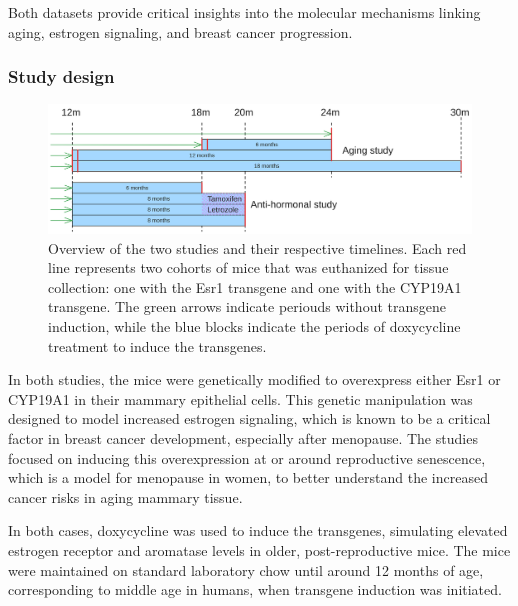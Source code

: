 Both datasets provide critical insights into the molecular mechanisms linking
aging, estrogen signaling, and breast cancer progression.

\subsubsection{Study design}

\begin{figure}[ht]
    \centering

    \includegraphics[width=\textwidth]{chapters/3_materials_and_methods/figures/datasets.png}
    \caption{Overview of the two studies and their respective timelines.
        Each red line represents two cohorts of mice that was euthanized for tissue
        collection: one with the Esr1 transgene and one with the CYP19A1 transgene.
        The green arrows indicate periouds without transgene induction, while the blue
        blocks indicate the periods of doxycycline treatment to induce the transgenes.
    } \label{fig:dataset_timeline} \end{figure}

In both studies, the mice were genetically modified to overexpress either Esr1 or
CYP19A1 in their mammary epithelial cells.
This genetic manipulation was designed to model increased estrogen signaling,
which is known to be a critical factor in breast cancer development, especially
after menopause\supercite{furth_esr1_2023,furth_overexpression_2023}.
The studies focused on inducing this overexpression at or around reproductive
senescence, which is a model for menopause in women, to better understand the
increased cancer risks in aging mammary
tissue\supercite{furth_esr1_2023,furth_overexpression_2023}.

In both cases, doxycycline was used to induce the transgenes, simulating
elevated estrogen receptor and aromatase levels in older, post-reproductive
mice.
The mice were maintained on standard laboratory chow until around 12 months of
age, corresponding to middle age in humans, when transgene induction was
initiated\supercite{furth_esr1_2023,furth_overexpression_2023}.

